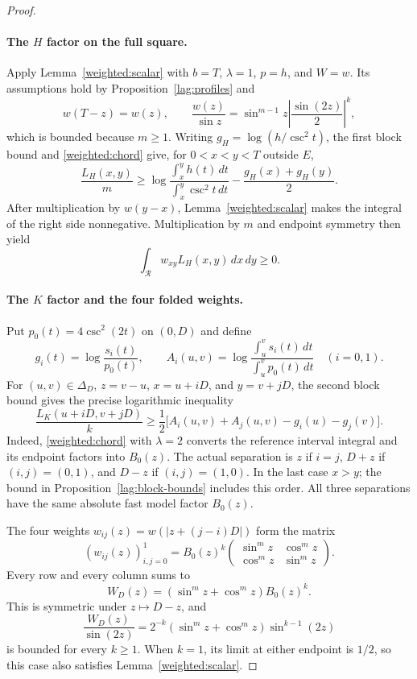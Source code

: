 \begin{proof}
\paragraph{The $H$ factor on the full square.}
Apply Lemma~\ref{weighted:scalar} with
$b=T$, $\lambda=1$, $p=h$, and $W=w$.  Its assumptions hold by
Proposition~\ref{lag:profiles} and
\[
 w(T-z)=w(z),\qquad
 \frac{w(z)}{\sin z}
 =\sin^{m-1}z\left|\frac{\sin(2z)}2\right|^k,
\]
which is bounded because $m\geq1$.
Writing $g_H=\log(h/\csc^2t)$, the first block bound and
\eqref{weighted:chord} give, for $0<x<y<T$ outside $E$,
\[
 \frac{L_H(x,y)}m
 \geq\log\frac{\int_x^y h(t)\,dt}{\int_x^y\csc^2t\,dt}
       -\frac{g_H(x)+g_H(y)}2.
\]
After multiplication by $w(y-x)$, Lemma~\ref{weighted:scalar}
makes the integral of the right side nonnegative.  Multiplication by
$m$ and endpoint symmetry then yield
\begin{equation}
 \int_{\mathcal R}w_{xy}L_H(x,y)\,dx\,dy\geq0.
 \label{weighted:H-log}
\end{equation}

\paragraph{The $K$ factor and the four folded weights.}
Put $p_0(t)=4\csc^2(2t)$ on $(0,D)$ and define
\[
 g_i(t)=\log\frac{s_i(t)}{p_0(t)},\qquad
 A_i(u,v)=\log\frac{\int_u^v s_i(t)\,dt}{\int_u^v p_0(t)\,dt}
 \quad(i=0,1).
\]
For $(u,v)\in\Delta_D$, $z=v-u$, $x=u+iD$, and $y=v+jD$, the second
block bound gives the precise logarithmic inequality
\begin{equation}
 \frac{L_K(u+iD,v+jD)}k
 \geq\frac12\bigl[A_i(u,v)+A_j(u,v)-g_i(u)-g_j(v)\bigr].
 \label{weighted:folded-bound}
\end{equation}
Indeed, \eqref{weighted:chord} with $\lambda=2$ converts the reference
interval integral and its endpoint factors into $B_0(z)$.
The actual separation is $z$ if $i=j$, $D+z$ if $(i,j)=(0,1)$,
and $D-z$ if $(i,j)=(1,0)$.  In the last case $x>y$; the bound in
Proposition~\ref{lag:block-bounds} includes this order.
All three separations have the same absolute fast model factor
$B_0(z)$.

The four weights $w_{ij}(z)=w(|z+(j-i)D|)$ form the matrix
\begin{equation}
 (w_{ij}(z))_{i,j=0}^1
 =B_0(z)^k
 \begin{pmatrix}
  \sin^m z&\cos^m z\\
  \cos^m z&\sin^m z
 \end{pmatrix}.
 \label{weighted:weight-matrix}
\end{equation}
Every row and every column sums to
\[
 W_D(z)=(\sin^m z+\cos^m z)B_0(z)^k.
\]
This is symmetric under $z\mapsto D-z$, and
\[
 \frac{W_D(z)}{\sin(2z)}
 =2^{-k}(\sin^m z+\cos^m z)\sin^{k-1}(2z)
\]
is bounded for every $k\geq1$.  When $k=1$, its limit at either endpoint
is $1/2$, so this case also satisfies Lemma~\ref{weighted:scalar}.


\end{proof}
